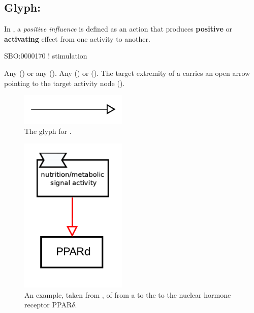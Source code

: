 \subsection{Glyph: }
\label{sec:af:positive_infl}

In \SBGNAFLone, a \emph{positive influence} is defined as an action that produces \textbf{positive} or \textbf{activating} effect from one activity to another.

\begin{glyphDescription}

\glyphSboTerm SBO:0000170 ! stimulation

 \glyphOrigin Any  () or any  ().
 \glyphTarget Any  () or  ().
 \glyphEndPoint The target extremity of a  carries an open arrow pointing to the target activity node ().

\end{glyphDescription}

\begin{figure}[H]
  \centering
  \includegraphics[width = 2in]{images/build/positiveInfluence.pdf}
  \caption{The \AF glyph for .}
  \label{fig:af:positiveInfl}
\end{figure}

\begin{figure}[H]
  \centering
  \includegraphics[width = 2in]{images/build/ex-positiveInfluence.pdf}
  \caption{An example, taken from , of  from a  to the to the nuclear hormone receptor PPAR$\delta$.}
  \label{fig:af:exPI}
\end{figure} 